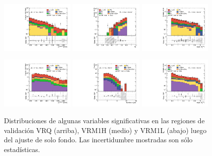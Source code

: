 \begin{figure}[ht!]
    \includegraphics[width=0.32\textwidth]{images/results/fr2_unblind/can_VRM1L_ph_pt0_afterFit.pdf}
    \includegraphics[width=0.32\textwidth]{images/results/fr2_unblind/can_VRM1L_rt4_afterFit.pdf}
    \includegraphics[width=0.32\textwidth]{images/results/fr2_unblind/can_VRM1L_dphi_jetmet_afterFit.pdf}

    \includegraphics[width=0.32\textwidth]{images/results/fr2_unblind/can_VRM1H_ph_pt0_afterFit.pdf}
    \includegraphics[width=0.32\textwidth]{images/results/fr2_unblind/can_VRM1H_jet_n_afterFit.pdf}
    \includegraphics[width=0.32\textwidth]{images/results/fr2_unblind/can_VRM1H_dphi_jetmet_afterFit.pdf}

    
    \caption{Distribuciones de algunas variables significativas en las regiones de validación VRQ (arriba), VRM1H (medio) y VRM1L (abajo) luego del ajuste de solo fondo. Las incertidumbre mostradas son sólo estadísticas.}
    \label{fig:dist_vrqm_bkgonly}
\end{figure}

